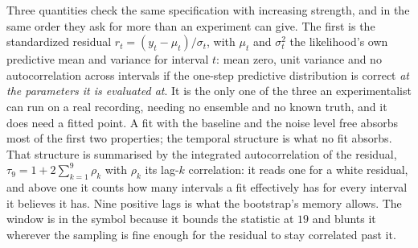 Three quantities check the same specification with increasing strength, and in the same order they
ask for more than an experiment can give. The first is the standardized
residual $r_t=(y_t-\mu_t)/\sigma_t$, with $\mu_t$ and $\sigma_t^2$ the likelihood's own predictive
mean and variance for interval $t$: mean zero, unit variance and no autocorrelation across intervals
if the one-step predictive distribution is correct \emph{at the parameters it is evaluated at}. It is
the only one of the three an experimentalist can run on a real recording, needing no ensemble and no
known truth, and it does need a fitted point. A fit with the baseline and the noise level free
absorbs most of the first two properties; the temporal structure is what no fit absorbs. That
structure is summarised by the integrated autocorrelation \citep{sokal1997monte} of the residual,
$\tau_{9}=1+2\sum_{k=1}^{9}\rho_k$ with $\rho_k$ its lag-$k$ correlation: it reads one for a white
residual, and above one it counts how many intervals a fit effectively has for every interval it
believes it has. Nine positive lags is what the bootstrap's memory allows. The window is in the
symbol because it bounds the statistic at $19$ and blunts it wherever the sampling is fine enough
for the residual to stay correlated past it.

